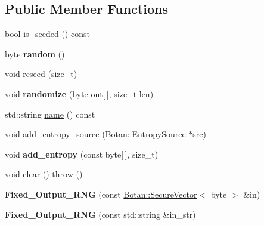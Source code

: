 \subsection*{Public Member Functions}
\begin{DoxyCompactItemize}
\item 
bool \hyperlink{classFixed__Output__RNG_a23f8fd5b837d143abbcca01f57237676}{is\-\_\-seeded} () const 
\item 
\hypertarget{classFixed__Output__RNG_a9ef030fddbea6c636ef51dcb50687368}{byte {\bfseries random} ()}\label{classFixed__Output__RNG_a9ef030fddbea6c636ef51dcb50687368}

\item 
void \hyperlink{classFixed__Output__RNG_affe39a29ce6f58044005a75deee83a0a}{reseed} (size\-\_\-t)
\item 
\hypertarget{classFixed__Output__RNG_aec6b76d94f2457a9172ddbd18b1536d8}{void {\bfseries randomize} (byte out\mbox{[}$\,$\mbox{]}, size\-\_\-t len)}\label{classFixed__Output__RNG_aec6b76d94f2457a9172ddbd18b1536d8}

\item 
std\-::string \hyperlink{classFixed__Output__RNG_a3a7689ea90acfe90fcc5d87741d32745}{name} () const 
\item 
void \hyperlink{classFixed__Output__RNG_adeeb86739dad64b3a4e57e6e974d96c6}{add\-\_\-entropy\-\_\-source} (\hyperlink{classBotan_1_1EntropySource}{Botan\-::\-Entropy\-Source} $\ast$src)
\item 
\hypertarget{classFixed__Output__RNG_ab7c9bb6b816c90d11c427e611912ec2c}{void {\bfseries add\-\_\-entropy} (const byte\mbox{[}$\,$\mbox{]}, size\-\_\-t)}\label{classFixed__Output__RNG_ab7c9bb6b816c90d11c427e611912ec2c}

\item 
void \hyperlink{classFixed__Output__RNG_a03ccdad4df7a864979137e99d846114c}{clear} ()  throw ()
\item 
\hypertarget{classFixed__Output__RNG_a1e9ee952808327958dea124512e4d426}{{\bfseries Fixed\-\_\-\-Output\-\_\-\-R\-N\-G} (const \hyperlink{classBotan_1_1SecureVector}{Botan\-::\-Secure\-Vector}$<$ byte $>$ \&in)}\label{classFixed__Output__RNG_a1e9ee952808327958dea124512e4d426}

\item 
\hypertarget{classFixed__Output__RNG_a12162708a784ebde8cbcafcd78bc4386}{{\bfseries Fixed\-\_\-\-Output\-\_\-\-R\-N\-G} (const std\-::string \&in\-\_\-str)}\label{classFixed__Output__RNG_a12162708a784ebde8cbcafcd78bc4386}

\end{DoxyCompactItemize}

